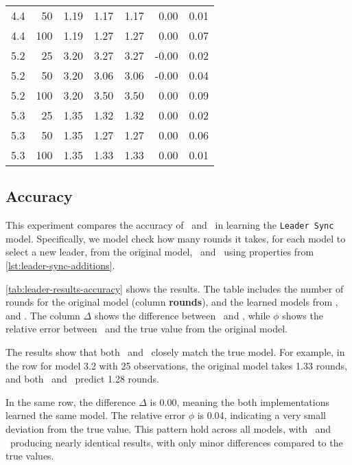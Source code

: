 \begin{table}
\begin{tabular}{rrrrrrr}
        4.4           & 50    & 1.19   & 1.17    & 1.17    & 0.00     & 0.01   \\
        4.4           & 100   & 1.19   & 1.27    & 1.27    & 0.00     & 0.07   \\
        5.2           & 25    & 3.20   & 3.27    & 3.27    & -0.00    & 0.02   \\
        5.2           & 50    & 3.20   & 3.06    & 3.06    & -0.00    & 0.04   \\
        5.2           & 100   & 3.20   & 3.50    & 3.50    & 0.00     & 0.09   \\
        5.3           & 25    & 1.35   & 1.32    & 1.32    & 0.00     & 0.02   \\
        5.3           & 50    & 1.35   & 1.27    & 1.27    & 0.00     & 0.06   \\
        5.3           & 100   & 1.35   & 1.33    & 1.33    & 0.00     & 0.01   \\
        \bottomrule
    \end{tabular}
\end{table}


\subsection{Accuracy}\label{subsec:accuracy}
This experiment compares the accuracy of \Cupaal\ and \Jajapy\ in learning the \texttt{Leader Sync} model.
Specifically, we model check how many rounds it takes, for each model to select a new leader, from the original model, \Jajapy\ and \Cupaal\ using properties from \autoref{lst:leader-sync-additions}.

\autoref{tab:leader-results-accuracy} shows the results.
The table includes the number of rounds for the original model (column \textbf{rounds}), and the learned models from \Jajapy, and \Cupaal.
The column $\Delta$ shows the difference between \Cupaal\ and \Jajapy, while $\phi$ shows the relative error between \Jajapy\ and the true value from the original model.

The results show that both \Cupaal\ and \Jajapy\ closely match the true model.
For example, in the row for model 3.2 with 25 observations, the original model takes 1.33 rounds, and both \Cupaal\ and \Jajapy\ predict 1.28 rounds.

In the same row, the difference $\Delta$ is 0.00, meaning the both implementations learned the same model.
The relative error $\phi$ is 0.04, indicating a very small deviation from the true value.
This pattern hold across all models, with \Cupaal\ and \Jajapy\ producing nearly identical results, with only minor differences compared to the true values.

